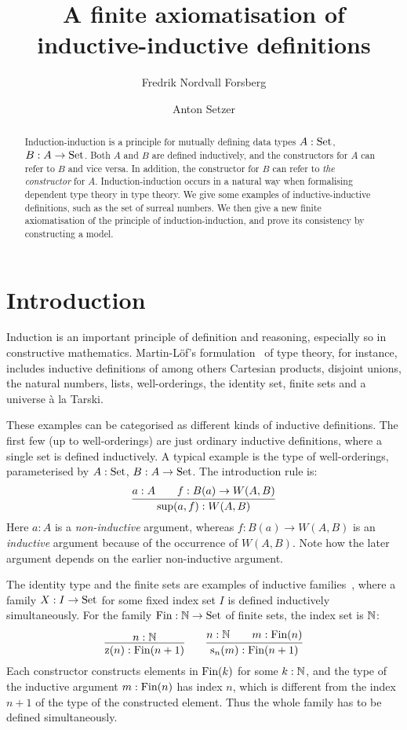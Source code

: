 \documentclass{article}
\title{A finite axiomatisation of inductive-inductive definitions}
\author{Fredrik Nordvall Forsberg}
\author{Anton Setzer}
\affil{Swansea University \\
Singleton  Park \\
Swansea SA2 8PP, UK}
\begin{document}
\maketitle

\begin{abstract}
  \noindent 
  Induction-induction is a principle for mutually defining data types
  $A : \text{Set}$, $B : A \to \text{Set}$. Both $A$ and $B$ are defined
  inductively, and the constructors for $A$ can refer to $B$ and vice
  versa. In addition, the constructor for $B$ can refer to \emph{the
    constructor} for $A$. Induction-induction occurs in a natural way
  when formalising dependent type theory in type theory.  We give some
  examples of inductive-inductive definitions, such as the set of
  surreal numbers. We then give a new finite axiomatisation of the
  principle of induction-induction, and prove its consistency by
  constructing a model.
\end{abstract}

\section{Introduction} %
\label{sec:introduction}

Induction is an important principle of definition and reasoning,
especially so in constructive mathematics.  Martin-L\"of's
formulation~\cite{martinlof1984bibliopolis} of type theory, for
instance, includes inductive definitions of among others Cartesian
products, disjoint unions, the natural numbers, lists, well-orderings,
the identity set, finite sets and a universe \`a la
Tarski. %

These examples can be categorised as different kinds of inductive
definitions. The first few (up to well-orderings) are just ordinary inductive
definitions, where a single set is defined inductively. A typical
example is the type of well-orderings, parameterised by $A : \text{Set}$, $B
: A \to \text{Set}$. The introduction rule is:
\[
\infer{\Wsup(a, f) : W(A, B)}{a : A & \quad f : B(a) \to W(A, B)}
\]
Here $a : A$ is a \emph{non-inductive} argument, whereas $f : B(a) \to
W(A, B)$ is an \emph{inductive} argument because of the occurrence of
$W(A, B)$. Note how the later argument depends on the earlier
non-inductive argument.

The identity type and the finite sets are examples
of inductive families~\cite{dybjer1994indfam}, where a family $X : I
\to \text{Set}$ for some fixed index set $I$ is defined inductively
simultaneously. For the family $\text{Fin} : \mathbb{N} \to \text{Set}$ of finite sets,
the index set is $\mathbb{N}$:
\[
\infer{\finzero{n} : \Fin(n + 1)}{n : \Nat} \qquad
\infer{\finsucc{n}{m} : \Fin(n + 1)}{n : \Nat & \quad m : \Fin(n)}
\]
Each constructor constructs elements in $\text{Fin}(k)$ for some $k : \mathbb{N}$,
and the type of the inductive argument $m : \text{Fin}(n)$ has index $n$,
which is different from the index $n + 1$ of the type of the
constructed element. Thus the whole family has to be defined
simultaneously.
\end{document}
